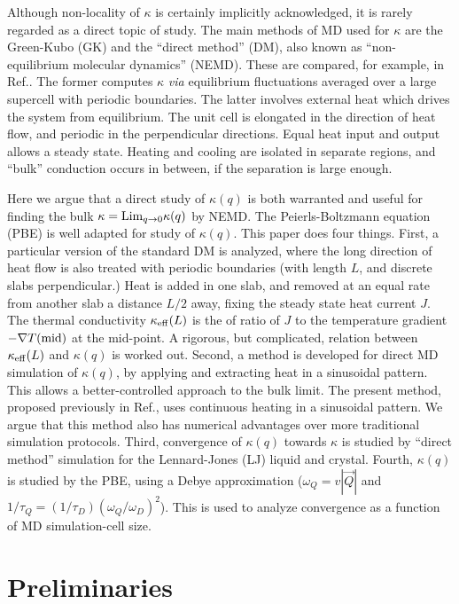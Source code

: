 \documentclass[aps,prb,twocolumn,showpacs,superscriptaddress]{revtex4-1}\begin{tiny}\end{tiny}
\begin{document}
Although non-locality of $\kappa$ is certainly implicitly acknowledged, it is rarely
\cite{Mahan} regarded as a direct topic of study.  The main methods of MD used
for $\kappa$ are the Green-Kubo (GK) and the ``direct method'' (DM),
also known as ``non-equilibrium molecular dynamics'' (NEMD). 
These are compared, for example, in Ref..  The former 
computes $\kappa$ {\it via} equilibrium fluctuations averaged over a large supercell with periodic boundaries.
The latter involves external heat which drives the system from equilibrium.  The unit cell
is elongated in the direction of heat flow, and periodic in the perpendicular directions.
Equal heat input and output allows a steady state.  Heating and cooling 
are isolated in separate regions, and ``bulk'' conduction occurs in between,
if the separation is large enough. 

Here we argue that a direct study of $\kappa(q)$ is both warranted and useful
for finding the bulk $\kappa={\rm Lim}_{q\rightarrow0}\kappa(q)$ by NEMD.
The Peierls-Boltzmann equation (PBE) is well adapted \cite{Allen} for study of $\kappa(q)$.
This paper does four things.  First, a particular version of the standard DM is analyzed, where
the long direction of heat flow is also treated with periodic
boundaries (with length $L$, and discrete slabs perpendicular.)
Heat is added in one slab, and removed at an equal rate from
another slab a distance $L/2$ away, fixing the steady state heat current $J$.  
The thermal conductivity $\kappa_{\rm eff}(L)$ is the of ratio of $J$ to the temperature
gradient $-\nabla T({\rm mid})$ at the mid-point.  A rigorous, but complicated, relation between
 $\kappa_{\rm eff}(L)$ and $\kappa(q)$ is worked out.
Second, a method is developed for direct MD simulation
of $\kappa(q)$, by applying and extracting heat in a sinusoidal pattern.  This allows a 
better-controlled approach to the bulk limit.  The present method, proposed 
previously in Ref., uses continuous heating in a sinusoidal pattern.  We
argue that this method also has numerical advantages over more
traditional simulation protocols.  Third, convergence of $\kappa(q)$ towards $\kappa$
is studied by ``direct method'' simulation
for the Lennard-Jones (LJ) liquid and crystal.  Fourth, $\kappa(q)$ is studied 
by the PBE, using a Debye approximation ($\omega_Q=v|\vec{Q}|$
and $1/\tau_Q = (1/\tau_D) (\omega_Q/\omega_D)^2$).  This is used to analyze convergence
as a function of MD simulation-cell size.

\section{Preliminaries}
\end{document}
